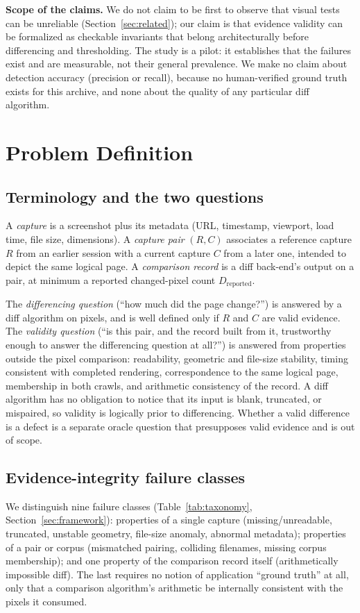 \documentclass[conference]{IEEEtran}
\newcommand{\Dr}{D_{\mathrm{reported}}}
\begin{document}
\textbf{Scope of the claims.} We do not claim to be first to observe that visual tests can be unreliable (Section~\ref{sec:related}); our claim is that evidence validity can be formalized as checkable invariants that belong architecturally before differencing and thresholding. The study is a pilot: it establishes that the failures exist and are measurable, not their general prevalence. We make no claim about detection accuracy (precision or recall), because no human-verified ground truth exists for this archive, and none about the quality of any particular diff algorithm.

\section{Problem Definition}
\subsection{Terminology and the two questions}
A \emph{capture} is a screenshot plus its metadata (URL, timestamp, viewport, load time, file size, dimensions). A \emph{capture pair} $(R,C)$ associates a reference capture $R$ from an earlier session with a current capture $C$ from a later one, intended to depict the same logical page. A \emph{comparison record} is a diff back-end's output on a pair, at minimum a reported changed-pixel count $\Dr$.

The \emph{differencing question} (``how much did the page change?'') is answered by a diff algorithm on pixels, and is well defined only if $R$ and $C$ are valid evidence. The \emph{validity question} (``is this pair, and the record built from it, trustworthy enough to answer the differencing question at all?'') is answered from properties outside the pixel comparison: readability, geometric and file-size stability, timing consistent with completed rendering, correspondence to the same logical page, membership in both crawls, and arithmetic consistency of the record. A diff algorithm has no obligation to notice that its input is blank, truncated, or mispaired, so validity is logically prior to differencing. Whether a valid difference is a defect is a separate oracle question that presupposes valid evidence and is out of scope.

\subsection{Evidence-integrity failure classes}
We distinguish nine failure classes (Table~\ref{tab:taxonomy}, Section~\ref{sec:framework}): properties of a single capture (missing/unreadable, truncated, unstable geometry, file-size anomaly, abnormal metadata); properties of a pair or corpus (mismatched pairing, colliding filenames, missing corpus membership); and one property of the comparison record itself (arithmetically impossible diff). The last requires no notion of application ``ground truth'' at all, only that a comparison algorithm's arithmetic be internally consistent with the pixels it consumed.
\end{document}
